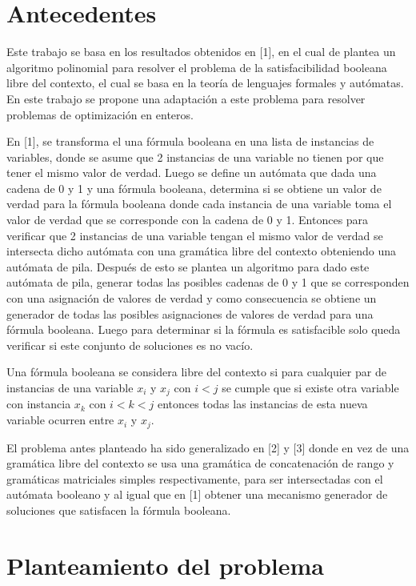 \documentclass{article}
\begin{document}
\section*{Antecedentes}

Este trabajo se basa en los resultados obtenidos en [1], en el cual de plantea un algoritmo polinomial para resolver el problema de la satisfacibilidad booleana libre del contexto, el cual
se basa en la teoría de lenguajes formales y autómatas. En este trabajo se propone una adaptación a este problema para resolver problemas de optimización en enteros.

En [1], se transforma el una fórmula booleana en una lista de instancias de variables, donde se asume que 2 instancias de una variable no tienen por que
tener el mismo valor de verdad. Luego se define un autómata que dada una cadena de 0 y 1 y una fórmula booleana, determina si se obtiene un valor de verdad para 
la fórmula booleana donde cada instancia de una variable toma el valor de verdad que se corresponde con la cadena de 0 y 1. Entonces para verificar 
que 2 instancias de una variable tengan el mismo valor de verdad se intersecta dicho autómata con una gramática libre del contexto obteniendo una autómata de pila.
Después de esto se plantea un algoritmo para dado este autómata de pila, generar todas las posibles cadenas de 0 y 1 que se corresponden con una asignación de valores de verdad y 
como consecuencia se obtiene un  generador de todas las posibles asignaciones de valores de verdad para una fórmula booleana. Luego para determinar si la fórmula es satisfacible
solo queda verificar si este conjunto de soluciones es no vacío.

Una fórmula booleana se considera libre del contexto si para cualquier par de instancias de una variable $x_i$ y $x_j$ con $i<j$ se cumple que si existe otra variable con instancia 
$x_k$ con $i<k<j$ entonces todas las instancias de esta nueva variable ocurren entre $x_i$ y $x_j$. 

El problema antes planteado ha sido generalizado en [2] y [3] donde en vez de una gramática libre del contexto se usa una gramática de concatenación de rango y gramáticas matriciales simples
respectivamente, para ser intersectadas con el autómata booleano y al igual que en [1] obtener una mecanismo generador de soluciones que satisfacen la fórmula booleana.

\section*{Planteamiento del problema}
\end{document}
